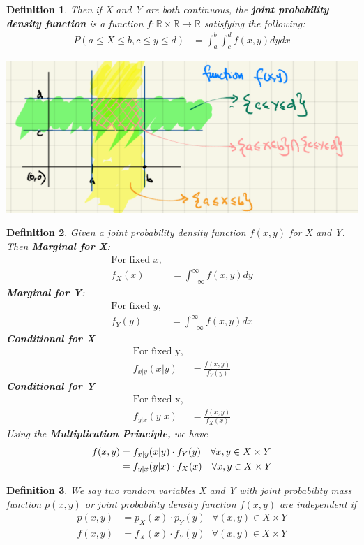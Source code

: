 \documentclass[11pt,oneside]{book}
\theoremstyle{break}
\theoremstyle{break}
\newtheorem{defn}{Definition}[corL]
\newcommand{\R}{\mathbb{R}}
\begin{document}
\begin{defn}
Then if X and Y are both continuous, the \textbf{joint probability density function} is a function $f:\R \times \R \rightarrow \R$ satisfying the following:\begin{align*}
P(a\leq X\leq b,c\leq y\leq d)&=\int_{a}^{b}\int_{c}^{d}f(x,y)dydx
\end{align*}
\end{defn}
\includegraphics[scale=0.5]{figures/joint_distribution}
\begin{defn}
Given a joint probability density function $f(x,y)$ for X and Y. Then \textbf{Marginal for X}:\begin{align*}
\text{For fixed }x,\\
f_X(x)&=\int_{-\infty}^{\infty}f(x,y)dy
\end{align*}
\textbf{Marginal for Y}:\begin{align*}
\text{For fixed }y,\\
f_Y(y)&=\int_{-\infty}^{\infty}f(x,y)dx
\end{align*}
\textbf{Conditional for X}\begin{align*}
\text{For fixed y,}\\
f_{x|y}(x|y)&=\frac{f(x,y)}{f_Y(y)}
\end{align*}
\textbf{Conditional for Y}
\begin{align*}
\text{For fixed x,}\\
f_{y|x}(y|x)&=\frac{f(x,y)}{f_X(x)}
\end{align*}
Using the \textbf{Multiplication Principle,} we have \begin{align*}
f(x,y)&=f_{x|y}(x|y)\cdot f_Y(y)\text{\quad}\forall x,y\in X\times Y\\
&=f_{y|x}(y|x)\cdot f_X(x)\text{\quad}\forall x,y\in X\times Y
\end{align*} 
\end{defn}
\begin{defn}
We say two random variables X and Y with joint probability mass function $p(x,y)$ or joint probability density function $f(x,y)$ are independent if \begin{align*}
p(x,y)&=p_X(x)\cdot p_Y(y) \text{ }\forall (x,y)\in X\times Y\\
f(x,y)&=f_X(x)\cdot f_Y(y) \text{ }\forall (x,y)\in X\times Y
\end{align*}
\end{defn}
\end{document}
